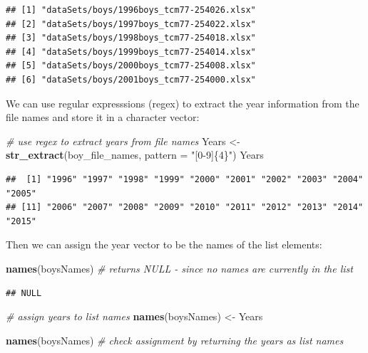 \documentclass[
]{book}
\newenvironment{Shaded}{\begin{snugshade}}{\end{snugshade}}
\newcommand{\CommentTok}[1]{\textcolor[rgb]{0.56,0.35,0.01}{\textit{#1}}}
\newcommand{\DataTypeTok}[1]{\textcolor[rgb]{0.13,0.29,0.53}{#1}}
\newcommand{\KeywordTok}[1]{\textcolor[rgb]{0.13,0.29,0.53}{\textbf{#1}}}
\newcommand{\NormalTok}[1]{#1}
\newcommand{\StringTok}[1]{\textcolor[rgb]{0.31,0.60,0.02}{#1}}
\begin{document}
\begin{verbatim}
## [1] "dataSets/boys/1996boys_tcm77-254026.xlsx"
## [2] "dataSets/boys/1997boys_tcm77-254022.xlsx"
## [3] "dataSets/boys/1998boys_tcm77-254018.xlsx"
## [4] "dataSets/boys/1999boys_tcm77-254014.xlsx"
## [5] "dataSets/boys/2000boys_tcm77-254008.xlsx"
## [6] "dataSets/boys/2001boys_tcm77-254000.xlsx"
\end{verbatim}

We can use regular expresssions (regex) to extract the year information from the file names and store it in a character vector:

\begin{Shaded}
\begin{Highlighting}[]
\CommentTok{\# use regex to extract years from file names}
\NormalTok{Years \textless{}{-}}\StringTok{ }\KeywordTok{str\_extract}\NormalTok{(boy\_file\_names, }\DataTypeTok{pattern =} \StringTok{"[0{-}9]\{4\}"}\NormalTok{)}
\NormalTok{Years}
\end{Highlighting}
\end{Shaded}

\begin{verbatim}
##  [1] "1996" "1997" "1998" "1999" "2000" "2001" "2002" "2003" "2004" "2005"
## [11] "2006" "2007" "2008" "2009" "2010" "2011" "2012" "2013" "2014" "2015"
\end{verbatim}

Then we can assign the year vector to be the names of the list elements:

\begin{Shaded}
\begin{Highlighting}[]
\KeywordTok{names}\NormalTok{(boysNames) }\CommentTok{\# returns NULL {-} since no names are currently in the list}
\end{Highlighting}
\end{Shaded}

\begin{verbatim}
## NULL
\end{verbatim}

\begin{Shaded}
\begin{Highlighting}[]
\CommentTok{\# assign years to list names}
\KeywordTok{names}\NormalTok{(boysNames) \textless{}{-}}\StringTok{ }\NormalTok{Years }

\KeywordTok{names}\NormalTok{(boysNames) }\CommentTok{\# check assignment by returning the years as list names}
\end{Highlighting}
\end{Shaded}
\end{document}

